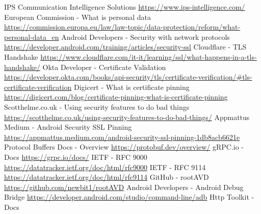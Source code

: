 \documentclass[a4paper, binding=0.6cm, noexaminfo, english]{sapthesis}
\begin{document}
		\begin{thebibliography}{99}
			 IPS Communication Intelligence Solutions \newline
			\url{https://www.ips-intelligence.com/}
			 European Commission - What is personal data \newline
			\url{https://commission.europa.eu/law/law-topic/data-protection/reform/what-personal-data_en}
			 Android Developers - Security with network protocols \newline
			\url{https://developer.android.com/training/articles/security-ssl}
			 Cloudflare - TLS Handshake \newline
			\url{https://www.cloudflare.com/it-it/learning/ssl/what-happens-in-a-tls-handshake/}
			 Okta Developer - Certificate Validation \newline
			\url{https://developer.okta.com/books/api-security/tls/certificate-verification/#tls-certificate-verification}	
			 Digicert - What is certificate pinning \newline
			\url{https://digicert.com/blog/certificate-pinning-what-is-certificate-pinning}				
			 Scotthelme.co.uk - Using security features to do bad things \newline
			\url{https://scotthelme.co.uk/using-security-features-to-do-bad-things/}
			 Appmattus Medium - Android Security SSL Pinning \newline
			\url{https://appmattus.medium.com/android-security-ssl-pinning-1db8acb6621e}	
			 Protocol Buffers Docs - Overview \newline
			\url{https://protobuf.dev/overview/}
			 gRPC.io - Docs \newline
			\url{https://grpc.io/docs/}
			 IETF - RFC 9000 \newline
			\url{https://datatracker.ietf.org/doc/html/rfc9000}
			 IETF - RFC 9114 \newline
			\url{https://datatracker.ietf.org/doc/html/rfc9114}
			 GitHub - rootAVD \newline
			\url{https://github.com/newbit1/rootAVD}
			 Android Developers - Android Debug Bridge \newline
			\url{https://developer.android.com/studio/command-line/adb}
			 Http Toolkit - Docs \newline

\end{thebibliography}
\end{document}
